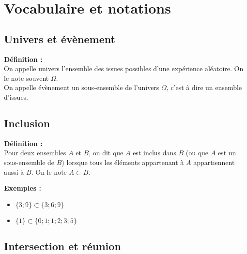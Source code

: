 \documentclass{article}
\title{\doctitre}
\author{\docniveau \\ \doctheme\text{ - }\doctype}
\date{}
\begin{document}
\maketitle
\pagestyle{custom}
\thispagestyle{custom}

\section{Vocabulaire et notations}

\subsection{Univers et évènement}

\begin{mdframed}[style=definitionStyle]
    \textbf{Définition :} ~\\
    On appelle univers l'ensemble des issues possibles d'une expérience aléatoire. On le note souvent $\Omega$.\\
    On appelle évènement un sous-ensemble de l'univers $\Omega$, c'est à dire un ensemble d'issues.
\end{mdframed}

\subsection{Inclusion}

\begin{mdframed}[style=definitionStyle]
    \textbf{Définition :} ~\\
    Pour deux ensembles $A$ et $B$, on dit que $A$ est inclus dans $B$ (ou que $A$ est un sous-ensemble de $B$) lorsque tous les éléments appartenant à $A$ 
    appartiennent aussi à $B$. On le note $A \subset B$.
\end{mdframed}

\textbf{Exemples :}
\vspace{-4pt}
\begin{itemize}
  \item $\{ 3;9 \} \subset \{ 3;6;9 \} $
  \item $\{ 1 \} \subset \{ 0;1;1;2;3;5 \} $
\end{itemize}

\subsection{Intersection et réunion}
\end{document}
